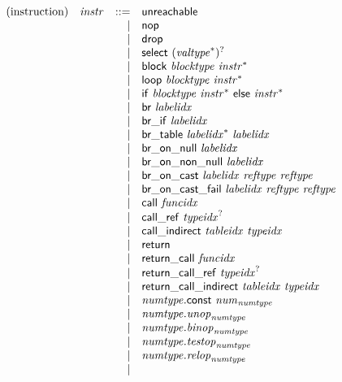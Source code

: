 $$
\begin{array}{@{}lrrl@{}l@{}}
\mbox{(instruction)} & {\mathit{instr}} &::=& \mathsf{unreachable} \\ &&|&
\mathsf{nop} \\ &&|&
\mathsf{drop} \\ &&|&
\mathsf{select}~{({{\mathit{valtype}}^\ast})^?} \\ &&|&
\mathsf{block}~{\mathit{blocktype}}~{{\mathit{instr}}^\ast} \\ &&|&
\mathsf{loop}~{\mathit{blocktype}}~{{\mathit{instr}}^\ast} \\ &&|&
\mathsf{if}~{\mathit{blocktype}}~{{\mathit{instr}}^\ast}~\mathsf{else}~{{\mathit{instr}}^\ast} \\ &&|&
\mathsf{br}~{\mathit{labelidx}} \\ &&|&
\mathsf{br\_if}~{\mathit{labelidx}} \\ &&|&
\mathsf{br\_table}~{{\mathit{labelidx}}^\ast}~{\mathit{labelidx}} \\ &&|&
\mathsf{br\_on\_null}~{\mathit{labelidx}} \\ &&|&
\mathsf{br\_on\_non\_null}~{\mathit{labelidx}} \\ &&|&
\mathsf{br\_on\_cast}~{\mathit{labelidx}}~{\mathit{reftype}}~{\mathit{reftype}} \\ &&|&
\mathsf{br\_on\_cast\_fail}~{\mathit{labelidx}}~{\mathit{reftype}}~{\mathit{reftype}} \\ &&|&
\mathsf{call}~{\mathit{funcidx}} \\ &&|&
\mathsf{call\_ref}~{{\mathit{typeidx}}^?} \\ &&|&
\mathsf{call\_indirect}~{\mathit{tableidx}}~{\mathit{typeidx}} \\ &&|&
\mathsf{return} \\ &&|&
\mathsf{return\_call}~{\mathit{funcidx}} \\ &&|&
\mathsf{return\_call\_ref}~{{\mathit{typeidx}}^?} \\ &&|&
\mathsf{return\_call\_indirect}~{\mathit{tableidx}}~{\mathit{typeidx}} \\ &&|&
{\mathit{numtype}}.\mathsf{const}~{{\mathit{num}}}_{{\mathit{numtype}}} \\ &&|&
{\mathit{numtype}} . {{\mathit{unop}}}_{{\mathit{numtype}}} \\ &&|&
{\mathit{numtype}} . {{\mathit{binop}}}_{{\mathit{numtype}}} \\ &&|&
{\mathit{numtype}} . {{\mathit{testop}}}_{{\mathit{numtype}}} \\ &&|&
{\mathit{numtype}} . {{\mathit{relop}}}_{{\mathit{numtype}}} \\ &&|&

\end{array}$$
